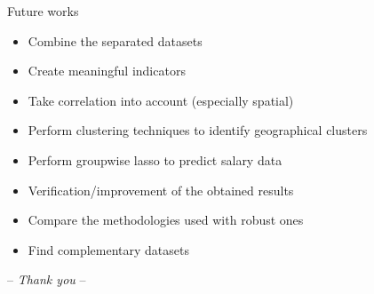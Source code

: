 \documentclass[12pt]{beamer}
\begin{document}
\begin{frame}{{Future works}}
	\begin{itemize}
		\item Combine the separated datasets
		\item Create meaningful indicators
		\item Take correlation into account (especially spatial)
		\item Perform clustering techniques to identify geographical clusters
		\item Perform groupwise lasso to predict salary data
		\item Verification/improvement of the obtained results 
		\item Compare the methodologies used with robust ones
		\item Find complementary datasets
	\end{itemize}	
\end{frame}		


\begin{frame}
	\centerline{\Huge\textcolor{bscuro}{ -- \emph{Thank you} -- }}
\end{frame}
\end{document}
